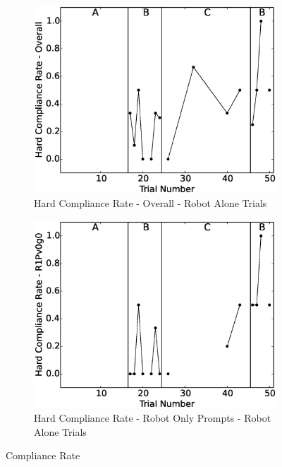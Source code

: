 \documentclass{ut-thesis}
\begin{document}
\begin{figure}[h]
	
	\begin{subfigure}[b]{0.49\textwidth}
		\includegraphics[width=1.1\linewidth]{./img/data_analysis/103HardComplianceRate-Overall_robotAloneOnly.eps}
		\caption{Hard Compliance Rate - Overall - Robot Alone Trials}
		\label{fig:103HardComplianceRate-Overall_robotAloneOnly}
	\end{subfigure}
	\hfill
	\begin{subfigure}[b]{0.49\textwidth}
		\includegraphics[width=1.1\linewidth]{./img/data_analysis/92HardComplianceRate-R1Pv0g0_robotAloneOnly.eps}
		\caption{Hard Compliance Rate - Robot Only Prompts - Robot Alone Trials}
		\label{fig:92HardComplianceRate-R1Pv0g0_robotAloneOnly}
	\end{subfigure}%
	\caption{Compliance Rate}
	\label{fig:ComplianceRate_robotAloneOnly}
\end{figure}
\end{document}
